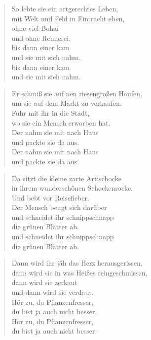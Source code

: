 \documentclass[9pt,a4paper,oneside, onecolumn]{article}
\begin{document}
\begin{multicols}{2}
\begin{verse}
So lebte sie ein artgerechtes Leben, \\
mit Welt und Feld in Eintracht eben, \\
ohne viel Bohai \\
und ohne Rennerei, \\
bis dann einer kam \\
und sie mit sich nahm. \\
bis dann einer kam \\
und sie mit sich nahm. \\
\end{verse}
\columnbreak
\begin{verse}
Er schmiß sie auf nen riesengroßen Haufen, \\
um sie auf dem Markt zu verkaufen. \\
Fuhr mit ihr in die Stadt, \\
wo sie ein Mensch erworben hat. \\
Der nahm sie mit nach Haus \\
und packte sie da aus. \\
Der nahm sie mit nach Haus \\
und packte sie da aus.\\
\end{verse}

\begin{verse}
Da sitzt die kleine zarte Artischocke \\
in ihrem wunderschönen Schockenrocke. \\
Und bebt vor Reisefieber. \\
Der Mensch beugt sich darüber \\
und schneidet ihr schnippschnapp \\
die grünen Blätter ab. \\
und schneidet ihr schnippschnapp \\
die grünen Blätter ab. \\
\end{verse}

\begin{verse}
Dann wird ihr jäh das Herz herausgerissen, \\
dann wird sie in was Heißes reingeschmissen, \\
dann wird sie zerkaut \\
und dann wird sie verdaut. \\
Hör zu, du Pflanzenfresser, \\
du bist ja auch nicht besser. \\
Hör zu, du Pflanzenfresser, \\
du bist ja auch nicht besser.\\
\end{verse}

\begin{verse}
\end{verse}
\end{multicols}
\end{document}
